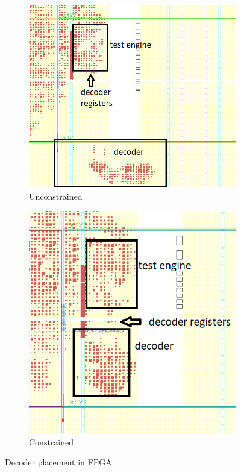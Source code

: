\begin{figure}[h]
\centering
\begin{subfigure}{.45\textwidth}
    \centering
    \includegraphics[width=\linewidth]{figures/Device_edited.png}
    \caption{Unconstrained}
    \label{subfig:uncon}
\end{subfigure}%
\hspace{\fill}
\begin{subfigure}{.45\textwidth}
    \centering
    \includegraphics[width=\linewidth]{figures/Device_Pblock_edited.png}
    \caption{Constrained}
    \label{subfig:con}
\end{subfigure}
\caption{Decoder placement in FPGA}
\label{fig:dec_routing}
\end{figure}

